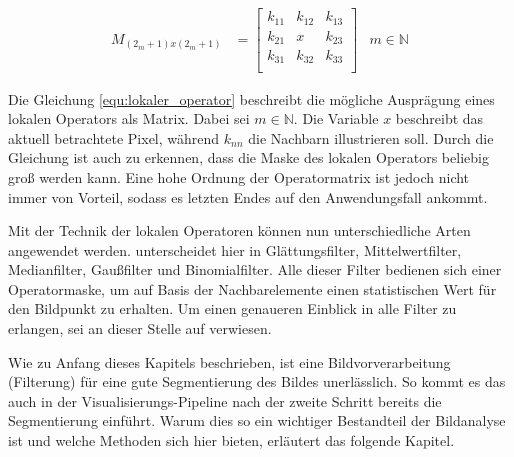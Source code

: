 \begin{align}
	\label{equ:lokaler_operator}M_{(2_m+1)x(2_m+1)} & = \begin{bmatrix}k_{11}&k_{12}&k_{13}\\ k_{21}&x&k_{23}\\ k_{31}&k_{32}&k_{33}\\\end{bmatrix} & m \in \mathbb{N}
\end{align}

Die Gleichung \ref{equ:lokaler_operator} beschreibt die mögliche Ausprägung eines
lokalen Operators als Matrix. Dabei sei $m \in \mathbb{N}$. Die Variable $x$ beschreibt
das aktuell betrachtete Pixel, während $k_{nn}$ die Nachbarn illustrieren soll. Durch
die Gleichung ist auch zu erkennen, dass die Maske des lokalen Operators
beliebig groß werden kann. Eine hohe Ordnung der Operatormatrix ist jedoch nicht
immer von Vorteil, sodass es letzten Endes auf den Anwendungsfall ankommt.

Mit der Technik der lokalen Operatoren können nun unterschiedliche Arten
angewendet werden. \citet[S.~54 - 55]{handels2000} unterscheidet hier in
Glättungsfilter, Mittelwertfilter, Medianfilter, Gaußfilter und Binomialfilter.
Alle dieser Filter bedienen sich einer Operatormaske, um auf Basis der Nachbarelemente
einen statistischen Wert für den Bildpunkt zu erhalten. Um einen genaueren
Einblick in alle Filter zu erlangen, sei an dieser Stelle auf \citet[S.~54 - 55]{handels2000}
verwiesen.

Wie zu Anfang dieses Kapitels beschrieben, ist eine Bildvorverarbeitung (Filterung)
für eine gute Segmentierung des Bildes unerlässlich. So kommt es das auch in der
Visualisierungs-Pipeline nach \citet[S.~50]{handels2000} der zweite Schritt bereits
die Segmentierung einführt. Warum dies so ein wichtiger Bestandteil der
Bildanalyse ist und welche Methoden sich hier bieten, erläutert das folgende Kapitel.

\pagebreak

